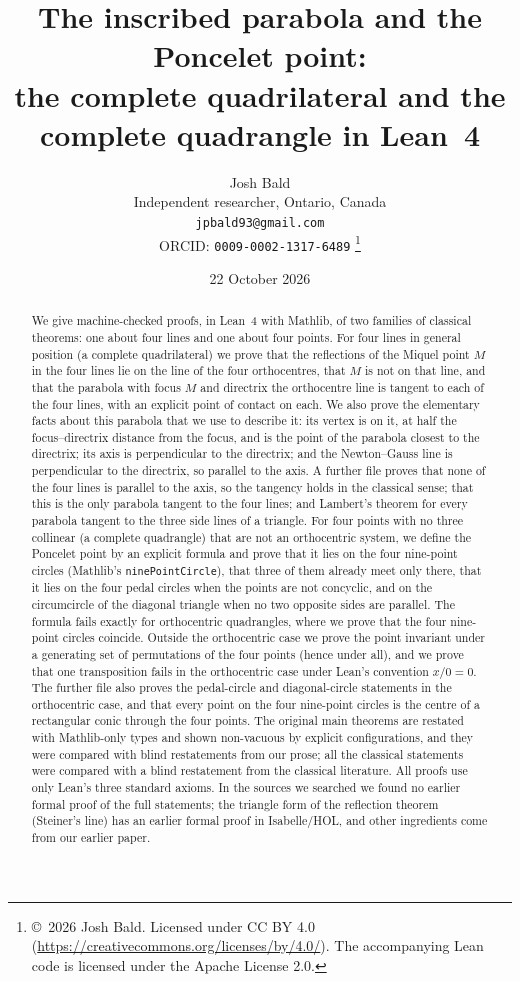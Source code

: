 \documentclass[11pt]{article}
\title{The inscribed parabola and the Poncelet point:\\ the complete quadrilateral and the complete quadrangle in Lean~4}
\author{Josh Bald\\ \small Independent researcher, Ontario, Canada\\ \small\texttt{jpbald93@gmail.com}\\
\small ORCID: \texttt{0009-0002-1317-6489}
\thanks{\copyright~2026 Josh Bald. Licensed under CC BY 4.0 (\url{https://creativecommons.org/licenses/by/4.0/}). The accompanying Lean code is licensed under the Apache License 2.0.}}
\date{22 October 2026}
\theoremstyle{definition}
\theoremstyle{remark}
\begin{document}
\sloppy
\maketitle
\begin{abstract}
We give machine-checked proofs, in Lean~4 with Mathlib, of two families of classical theorems: one
about four lines and one about four points. For four lines in general position (a complete
quadrilateral) we prove that the reflections of the Miquel point $M$ in the four lines lie on the line
of the four orthocentres, that $M$ is not on that line, and that the parabola with focus $M$ and
directrix the orthocentre line is tangent to each of the four lines, with an explicit point of contact
on each. We also prove the elementary facts about this parabola that we use to describe it: its vertex
is on it, at half the focus--directrix distance from the focus, and is the point of the parabola
closest to the directrix; its axis is perpendicular to the directrix; and the Newton--Gauss line is
perpendicular to the directrix, so parallel to the axis. A further file proves that none of the four
lines is parallel to the axis, so the tangency holds in the classical sense; that this is the only
parabola tangent to the four lines; and Lambert's theorem for every parabola tangent to the three side
lines of a triangle. For four points with no three collinear (a complete quadrangle) that are not an orthocentric
system, we define the Poncelet point by an explicit formula and prove that it lies on the four
nine-point circles (Mathlib's
\texttt{ninePointCircle}), that three of them already meet only there, that it lies on the four
pedal circles when the points are not concyclic, and on the circumcircle of the diagonal triangle
when no two opposite sides are parallel. The formula fails exactly for orthocentric quadrangles, where
we prove that the four nine-point circles coincide. Outside the orthocentric case we prove the point invariant
under a generating set of permutations of the four points (hence under all), and we prove that one
transposition fails in the orthocentric case under Lean's convention $x/0=0$. The further file also
proves the pedal-circle and diagonal-circle statements in the orthocentric case, and that every point
on the four nine-point circles is the centre of a rectangular conic through the four points. The original
main theorems are restated with Mathlib-only types and shown non-vacuous by explicit configurations, and
they were compared with blind restatements from our prose; all the classical statements were compared
with a blind restatement from the classical literature.
All proofs use only Lean's three standard axioms. In the sources
we searched we found no earlier formal proof of the full statements; the triangle form of the
reflection theorem (Steiner's line) has an earlier formal proof in Isabelle/HOL, and other ingredients
come from our earlier paper.
\end{abstract}
\end{document}
